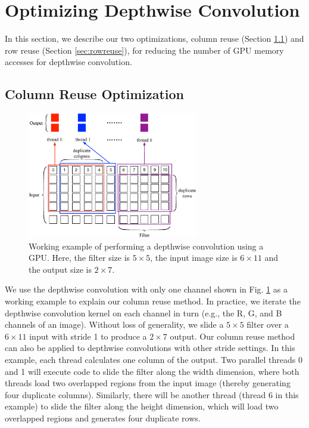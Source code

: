 \section{Optimizing Depthwise Convolution}
\label{sec:strategies} In this section, we describe our two optimizations, column reuse (Section \ref{sec:creuse}) and row reuse (Section
\ref{sec:rowreuse}), for reducing the number of GPU memory accesses for depthwise convolution.
\subsection{Column Reuse Optimization}
\label{sec:creuse}


\begin{figure}[t!]
\centering
  \includegraphics[width=0.9\columnwidth,height=5.5cm]{./figure/twostrategies.eps}
  \vspace{-3mm}
  \caption{Working example of performing a depthwise convolution using a GPU. Here, the filter size is $5 \times 5$, the input image size is $6 \times 11$
  and the output size is $2 \times 7$.}
  \label{fig:twostrategies}
\end{figure}


 We use the depthwise convolution with only one channel shown in Fig. \ref{fig:twostrategies} as a working
example to explain our column reuse method. In practice, we iterate the depthwise convolution kernel on each channel in turn (e.g., the R,
G, and B channels of an image). Without loss of generality, we slide a $5 \times 5$ filter over a $6 \times 11$ input with stride 1 to
produce a $2 \times 7$ output. Our column reuse method can also be applied to depthwise convolutions with other stride settings. In this
example, each thread calculates one column of the output. Two parallel threads 0 and 1 will execute code to slide the filter along the
width dimension, where both threads load two overlapped regions from the input image (thereby generating four duplicate columns).
Similarly, there will be another thread (thread 6 in this example) to slide the filter along the height dimension, which will load two
overlapped regions and generates four duplicate rows.


